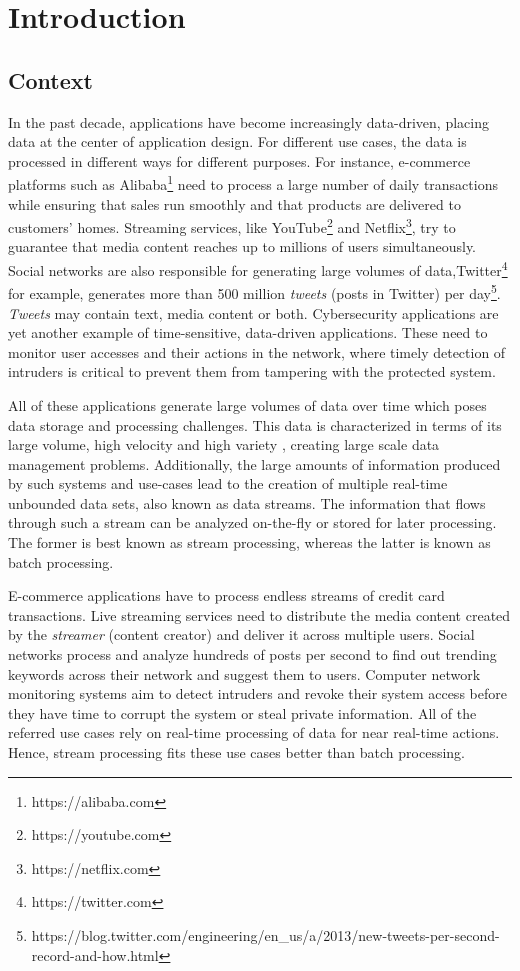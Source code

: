 \chapter{Introduction} \label{chap:intro} \minitoc

\section{Context} \label{sec:context}
In the past decade, applications have become increasingly data-driven, placing data at the center of application design. For different use cases, the data is processed in different ways for different purposes. For instance, e-commerce platforms such as Alibaba\footnote{https://alibaba.com} need to process a large number of daily transactions while ensuring that sales run smoothly and that products are delivered to customers' homes. Streaming services, like YouTube\footnote{https://youtube.com} and Netflix\footnote{https://netflix.com}, try to guarantee that media content reaches up to millions of users simultaneously. Social networks are also responsible for generating large volumes of data,Twitter\footnote{https://twitter.com} for example, generates more than 500 million \textit{tweets} (posts in Twitter) per day\footnote{https://blog.twitter.com/engineering/en\_us/a/2013/new-tweets-per-second-record-and-how.html}. \textit{Tweets} may contain text, media content or both. Cybersecurity applications are yet another example of time-sensitive, data-driven applications. These need to monitor user accesses and their actions in the network, where timely detection of intruders is critical to prevent them from tampering with the protected system.

All of these applications generate large volumes of data over time which poses data storage and processing challenges. This data is characterized in terms of its large volume, high velocity and high variety \cite{Mavragani-GoogleTrends-SLR}, creating large scale data management problems. Additionally, the large amounts of information produced by such systems and use-cases lead to the creation of multiple real-time unbounded data sets, also known as data streams. The information that flows through such a stream can be analyzed on-the-fly or stored for later processing. The former is best known as stream processing, whereas the latter is known as batch processing. 

E-commerce applications have to process endless streams of credit card transactions. Live streaming services need to distribute the media content created by the \textit{streamer} (content creator) and deliver it across multiple users. Social networks process and analyze hundreds of posts per second to find out trending keywords across their network and suggest them to users. Computer network monitoring systems aim to detect intruders and revoke their system access before they have time to corrupt the system or steal private information. All of the referred use cases rely on real-time processing of data for near real-time actions. Hence, stream processing fits these use cases better than batch processing.

